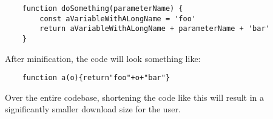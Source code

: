 \begin{verbatim}
    function doSomething(parameterName) {
        const aVariableWithALongName = 'foo'
        return aVariableWithALongName + parameterName + 'bar'
    }
\end{verbatim}

After minification, the code will look something like:

\begin{verbatim}
    function a(o){return"foo"+o+"bar"}
\end{verbatim}

Over the entire codebase, shortening the code like this will result in a significantly smaller download size for the user.
